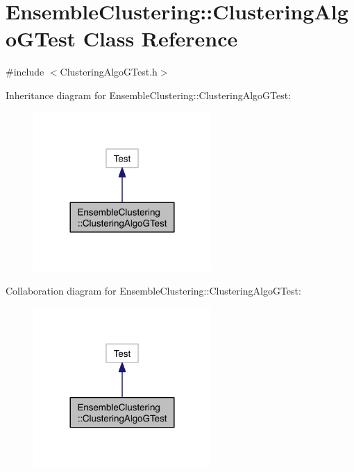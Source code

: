 \hypertarget{class_ensemble_clustering_1_1_clustering_algo_g_test}{\section{Ensemble\-Clustering\-:\-:Clustering\-Algo\-G\-Test Class Reference}
\label{class_ensemble_clustering_1_1_clustering_algo_g_test}
}


{\ttfamily \#include $<$Clustering\-Algo\-G\-Test.\-h$>$}



Inheritance diagram for Ensemble\-Clustering\-:\-:Clustering\-Algo\-G\-Test\-:
\nopagebreak
\begin{figure}[H]
\begin{center}
\leavevmode
\includegraphics[width=192pt]{class_ensemble_clustering_1_1_clustering_algo_g_test__inherit__graph}
\end{center}
\end{figure}


Collaboration diagram for Ensemble\-Clustering\-:\-:Clustering\-Algo\-G\-Test\-:
\nopagebreak
\begin{figure}[H]
\begin{center}
\leavevmode
\includegraphics[width=192pt]{class_ensemble_clustering_1_1_clustering_algo_g_test__coll__graph}
\end{center}
\end{figure}


